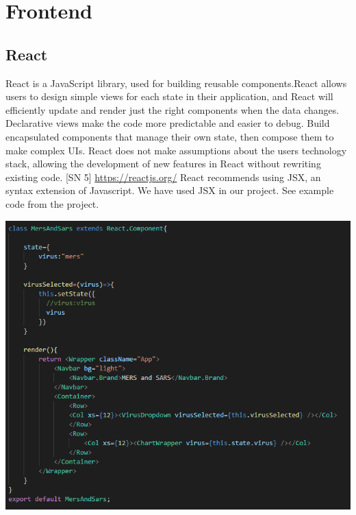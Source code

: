 \section{Frontend}
\subsection{React}
React is a JavaScript library, used for building reusable components.React allows users to design simple views for each state in their application, and React will efficiently update and render just the right components when the data changes.
Declarative views make the code more predictable and easier to debug. Build encapsulated components that manage their own state, then compose them to make complex UIs.
React does not make assumptions about the users technology stack, allowing the development of new features in React without rewriting existing code. [SN 5] \url{https://reactjs.org/}
React recommends using JSX, an syntax extension of Javascript. We have used JSX in our project.
See example code from the project.
\begin{center}    
      \includegraphics[scale=0.6]{img/jsx.PNG}
\end{center}

